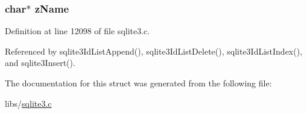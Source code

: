 \subsubsection[{z\+Name}]{\setlength{\rightskip}{0pt plus 5cm}char$\ast$ z\+Name}\label{struct_id_list_1_1_id_list__item_a661118d86ac4127d40bf3be78d92117d}


Definition at line 12098 of file sqlite3.\+c.



Referenced by sqlite3\+Id\+List\+Append(), sqlite3\+Id\+List\+Delete(), sqlite3\+Id\+List\+Index(), and sqlite3\+Insert().



The documentation for this struct was generated from the following file\+:\begin{DoxyCompactItemize}
\item 
libs/\hyperlink{sqlite3_8c}{sqlite3.\+c}\end{DoxyCompactItemize}
